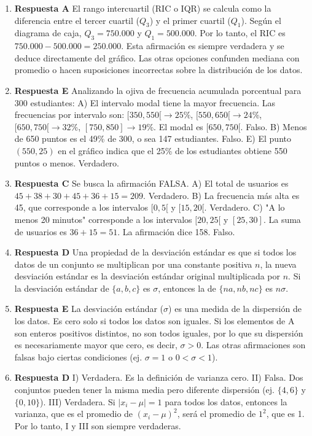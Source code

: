 \documentclass[11pt]{article}
\begin{document}
\begin{enumerate}
    \item \textbf{Respuesta A} El rango intercuartil (RIC o IQR) se calcula como la diferencia entre el tercer cuartil ($Q_3$) y el primer cuartil ($Q_1$). Según el diagrama de caja, $Q_3 = 750.000$ y $Q_1 = 500.000$. Por lo tanto, el RIC es $750.000 - 500.000 = 250.000$. Esta afirmación es siempre verdadera y se deduce directamente del gráfico. Las otras opciones confunden mediana con promedio o hacen suposiciones incorrectas sobre la distribución de los datos. %
    
    \item \textbf{Respuesta E} Analizando la ojiva de frecuencia acumulada porcentual para 300 estudiantes: A) El intervalo modal tiene la mayor frecuencia. Las frecuencias por intervalo son: $[350,550[\to25\%$, $[550,650[\to24\%$, $[650,750[\to32\%$, $[750,850]\to19\%$. El modal es $[650,750[$. Falso. B) Menos de 650 puntos es el 49\% de 300, o sea 147 estudiantes. Falso. E) El punto $(550, 25)$ en el gráfico indica que el 25\% de los estudiantes obtiene 550 puntos o menos. Verdadero. %
    
    \item \textbf{Respuesta C} Se busca la afirmación FALSA. A) El total de usuarios es $45+38+30+45+36+15 = 209$. Verdadero. B) La frecuencia más alta es 45, que corresponde a los intervalos $[0, 5[$ y $[15, 20[$. Verdadero. C) "A lo menos 20 minutos" corresponde a los intervalos $[20, 25[$ y $[25, 30]$. La suma de usuarios es $36 + 15 = 51$. La afirmación dice 158. Falso. %

    \item \textbf{Respuesta D} Una propiedad de la desviación estándar es que si todos los datos de un conjunto se multiplican por una constante positiva $n$, la nueva desviación estándar es la desviación estándar original multiplicada por $n$. Si la desviación estándar de $\{a, b, c\}$ es $\sigma$, entonces la de $\{na, nb, nc\}$ es $n\sigma$. %

    \item \textbf{Respuesta E} La desviación estándar ($\sigma$) es una medida de la dispersión de los datos. Es cero solo si todos los datos son iguales. Si los elementos de A son enteros positivos distintos, no son todos iguales, por lo que su dispersión es necesariamente mayor que cero, es decir, $\sigma > 0$. Las otras afirmaciones son falsas bajo ciertas condiciones (ej. $\sigma=1$ o $0 < \sigma < 1$). %
    
    \item \textbf{Respuesta D} I) Verdadera. Es la definición de varianza cero. II) Falsa. Dos conjuntos pueden tener la misma media pero diferente dispersión (ej. $\{4,6\}$ y $\{0,10\}$). III) Verdadera. Si $|x_i - \mu| = 1$ para todos los datos, entonces la varianza, que es el promedio de $(x_i - \mu)^2$, será el promedio de $1^2$, que es 1. Por lo tanto, I y III son siempre verdaderas. %
    

\end{enumerate}
\end{document}
